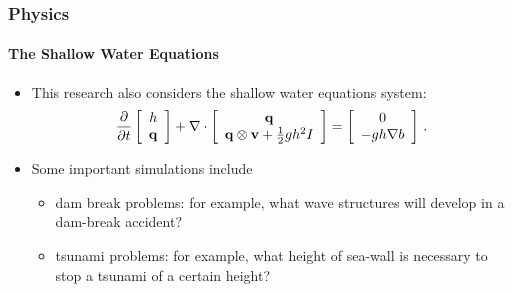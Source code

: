 \documentclass{beamer}
\begin{document}
\begin{frame}
\frametitle{Physics}
\framesubtitle{The Shallow Water Equations}

\begin{itemize}
  \item This research also considers the shallow water equations system:
    \begin{equation}
      \frac{\partial }{\partial t}\left[\begin{array}{c}h\\\mathbf{q}\end{array}\right]
        + \nabla\cdot\left[\begin{array}{c}\mathbf{q}\\
          \mathbf{q}\otimes\mathbf{v} + \frac{1}{2}gh^2 I
          \end{array}\right]
        = \left[\begin{array}{c}0\\-gh\nabla b\end{array}
    \right] \,.
    \end{equation}
  \item Some important simulations include
    \begin{itemize}
      \item \textcolor{secondarycolorheavy}{dam break problems}: for example, what wave
        structures will develop in a dam-break accident?
      \item \textcolor{secondarycolorheavy}{tsunami problems}: for example, what height
        of sea-wall is necessary to stop a tsunami of a certain height?
    \end{itemize}
\end{itemize}

\end{frame}
\end{document}
